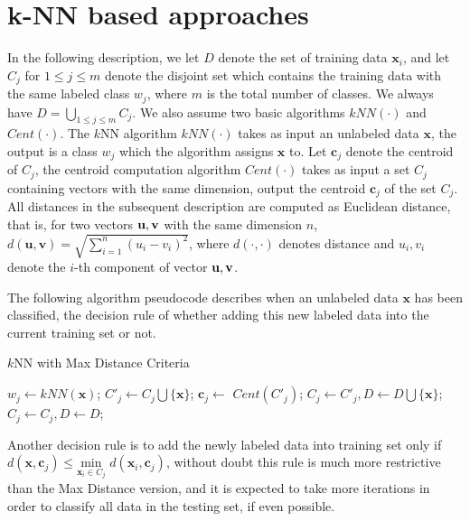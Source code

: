 \documentclass[10pt]{article}
\newcommand{\x}{\textbf{x}}
\newcommand{\cc}{\textbf{c}}
\begin{document}
\section{k-NN based approaches}
In the following description, we let $D$ denote the set of training data $\x_i$, and let $C_j$ for $1\leq j\leq m$ denote the disjoint set which contains the training data with the same labeled class $w_j$, where $m$ is the total number of classes. We always have $D=\bigcup_{1\leq j\leq m} C_j$. We also assume two basic algorithms $kNN(\cdot)$ and $Cent(\cdot)$. The $k$NN algorithm $kNN(\cdot)$ takes as input an unlabeled data $\x$, the output is a class $w_j$ which the algorithm assigns $\x$ to. Let $\cc_j$ denote the centroid of $C_j$, the centroid computation algorithm $Cent(\cdot)$ takes as input a set $C_j$ containing vectors with the same dimension, output the centroid $\cc_j$ of the set $C_j$. All distances in the subsequent description are computed as Euclidean distance, that is, for two vectors $\bf{u},\bf{v}$ with the same dimension $n$, $d(\textbf{u},\textbf{v})=\sqrt{\sum_{i=1}^{n}(u_i-v_i)^2}$, where $d(\cdot,\cdot)$ denotes distance and $u_i,v_i$ denote the $i$-th component of vector $\bf{u,v}$.

The following algorithm pseudocode describes when an unlabeled data $\x$ has been classified, the decision rule of whether adding this new labeled data into the current training set or not.

\begin{algorithm}
\caption{$k$NN with Max Distance Criteria}
\begin{algorithmic}[1]
\Procedure {$k$NN-MD}{$\x, D$}

\State $w_j \gets kNN(\x)$;
\State $C'_j \gets C_j \bigcup \{\x\}$;
\State $\cc_j \gets$ $Cent(C'_j)$;
\If {$d(\x,\cc_j)\leq \underset{\x_i\in C_j}{\text{max}}$ $d(\x_i,\cc_j)$}
\State $C_j \gets C'_j, D \gets D\bigcup \{\x\}$;
\Else
\State $C_j \gets C_j, D \gets D$;
\EndIf

\EndProcedure
\end{algorithmic}
\end{algorithm}

Another decision rule is to add the newly labeled data into training set only if $d(\x,\cc_j)\leq \underset{\x_i\in C_j}{\text{min}}$ $d(\x_i,\cc_j)$, without doubt this rule is much more restrictive than the Max Distance version, and it is expected to take more iterations in order to classify all data in the testing set, if even possible.
\end{document}
